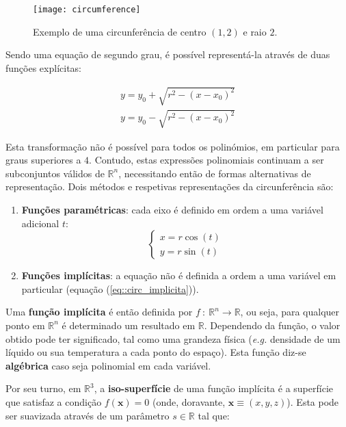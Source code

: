 \begin{figure}[!btp]
	\centering
	\texttt{[image: circumference]}
	\caption[Exemplo de uma circunferência]{Exemplo de uma circunferência de centro $(1, 2)$ e raio $2$.}
	\label{fig::circumference}
\end{figure}

Sendo uma equação de segundo grau, é possível representá-la através de duas funções explícitas:

\begin{eqnarray}
		y = y_0 + \sqrt{r^2 - (x - x_0)^2} \\
		y = y_0 - \sqrt{r^2 - (x - x_0)^2}
\end{eqnarray}

Esta transformação não é possível para todos os polinómios, em particular para graus superiores a $4$. Contudo, estas expressões polinomiais continuam a ser subconjuntos válidos de $\mathbb{R}^n$, necessitando então de formas alternativas de representação. Dois métodos e respetivas representações da circunferência são:

\begin{enumerate}
	\item \textbf{Funções paramétricas}: cada eixo é definido em ordem a uma variável adicional $t$:
	\begin{equation}
		\left\{\begin{array}{l}
			x = r\cos(t) \\
			y = r\sin(t)
		\end{array}\right.
	\label{eq::circ_parametrica}
	\end{equation}
	
	\item \textbf{Funções implícitas}: a equação não é definida a ordem a uma variável em particular (equação (\ref{eq::circ_implicita})).
\end{enumerate}

Uma \textbf{função implícita} é então definida por $f~:~\mathbb{R}^n \longrightarrow \mathbb{R}$, ou seja, para qualquer ponto em $\mathbb{R}^n$ é determinado um resultado em $\mathbb{R}$. Dependendo da função, o valor obtido pode ter significado, tal como uma grandeza física (\textit{e.g.} densidade de um líquido ou sua temperatura a cada ponto do espaço). Esta função diz-se \textbf{algébrica} caso seja polinomial em cada variável.

Por seu turno, em $\mathbb{R}^3$, a \textbf{iso-superfície} de uma função implícita é a superfície que satisfaz a condição $f(\mathbf{x}) = 0$ (onde, doravante, $\mathbf{x} \equiv (x,y,z)$). Esta pode ser suavizada através de um parâmetro $s \in \mathbb{R}$ tal que:

